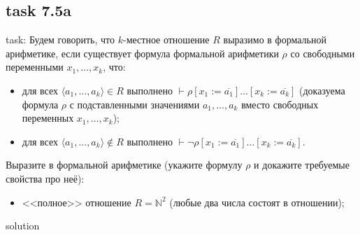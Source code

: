 \documentclass[12pt]{article}
\begin{document}
\subsection*{task 7.5a}

task: Будем говорить, что $k$-местное отношение $R$ выразимо в формальной арифметике,
если существует формула формальной арифметики $\rho$ со свободными переменными $x_1, \dots, x_k$, что:
\begin{itemize}
\item для всех $\langle a_1, \dots, a_k \rangle \in R$ выполнено $\vdash\rho[x_1 := \overline{a_1}]\dots[x_k := \overline{a_k}]$
(доказуема формула $\rho$ с подставленными значениями $a_1, \dots, a_k$ вместо свободных переменных $x_1, \dots, x_k$);
\item для всех $\langle a_1, \dots, a_k \rangle \notin R$ выполнено $\vdash\neg\rho[x_1 := \overline{a_1}]\dots[x_k := \overline{a_k}]$.
\end{itemize}

Выразите в формальной арифметике (укажите формулу $\rho$ и докажите требуемые свойства про неё):
\begin{itemize}
    \item <<полное>> отношение $R = \mathbb{N}^2$ (любые два числа состоят в отношении);
\end{itemize}

solution
\end{document}
